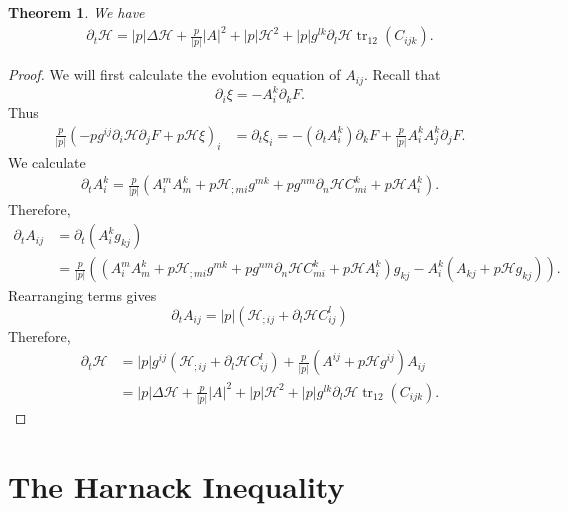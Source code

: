 \documentclass{amsart}
\newtheorem{theorem}{Theorem}
\theoremstyle{definition}
\theoremstyle{remark}
\numberwithin{equation}{section}
\begin{document}
\begin{theorem} We have
\begin{align*}
\partial_t\mathcal{H}= |p| \Delta \mathcal{H}+\frac{p}{|p|}| A |^2+ |p|  \mathcal{H}^2+ |p|  g^{lk}\partial_l\mathcal{H} \operatorname{tr}_{12}( C _{ijk}).
\end{align*}
\end{theorem}
\begin{proof}
We will first calculate the evolution equation of $ A _{ij}.$ Recall that $$\partial_i\xi=- A _i^k\partial_kF.$$ Thus
\begin{align*}
\frac{p}{|p|}\left(- p  g^{ij}\partial_i\mathcal{H}\partial_jF+ p  \mathcal{H}\xi\right)_i&=\partial_t\xi_i=-(\partial_t A _i^k)\partial_kF+\frac{p}{|p|} A _i^k A _j^k\partial_jF.
\end{align*}
We calculate
\begin{align*}
\partial_t A _i^k=\frac{p}{|p|}( A _i^m A _m^k+ p  \mathcal{H}_{;mi}g^{mk}+ p
g^{nm}\partial_n \mathcal{H} C _{mi}^k+ p  \mathcal{H} A _i^k).
\end{align*}
Therefore,
\begin{align*}
\partial_t A _{ij}&=\partial_t( A _i^kg_{kj})\\
&=\frac{p}{|p|}\left(\left( A _i^m A _m^k+ p  \mathcal{H}_{;mi}g^{mk}+ p
g^{nm}\partial_n \mathcal{H} C _{mi}^k+ p  \mathcal{H} A _i^k\right)g_{kj}- A _i^k
( A _{kj}+ p  \mathcal{H}g_{kj})\right).
\end{align*}
Rearranging terms gives
\[\partial_t  A _{ij}= |p|  (\mathcal{H}_{;ij}+  \partial_l\mathcal{H}  C _{ij}^l)\]
Therefore,
\begin{align*}
\partial_t\mathcal{H}&=|p|g^{ij}( \mathcal{H}_{;ij}+  \partial_l \mathcal{H} C ^l_{ij})+\frac{p}{|p|}( A ^{ij}+ p  \mathcal{H}g^{ij}) A _{ij}\\
&= |p| \Delta \mathcal{H}+\frac{p}{|p|}| A |^2+ |p|  \mathcal{H}^2+ |p|  g^{lk}\partial_l\mathcal{H} \operatorname{tr}_{12}( C _{ijk}).
\end{align*}
\end{proof}

\section{The Harnack Inequality}
\end{document}

